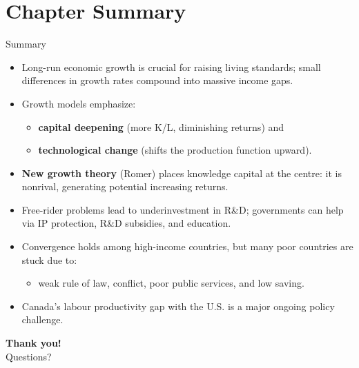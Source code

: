 \documentclass[aspectratio=169]{beamer}
\begin{document}
\section*{Chapter Summary}

\begin{frame}{Summary}
\transfade
\begin{itemize}[<+->]
  \item Long-run economic growth is crucial for raising living standards; small differences in growth rates compound into massive income gaps.
  \item Growth models emphasize:
  \begin{itemize}[<+->]
    \item \textbf{capital deepening} (more K/L, diminishing returns) and
    \item \textbf{technological change} (shifts the production function upward).
  \end{itemize}
  \item \textbf{New growth theory} (Romer) places knowledge capital at the centre: it is nonrival, generating potential increasing returns.
  \item Free-rider problems lead to \alert{underinvestment} in R\&D; governments can help via IP protection, R\&D subsidies, and education.
  \item Convergence holds among high-income countries, but many poor countries are stuck due to:
  \begin{itemize}[<+->]
    \item weak rule of law, conflict, poor public services, and low saving.
  \end{itemize}
  \item Canada's \alert{labour productivity gap} with the U.S. is a major ongoing policy challenge.
\end{itemize}
\end{frame}

\begin{frame}
\centering
\Huge \textbf{Thank you!}\\[1em]
\large Questions?
\end{frame}
\end{document}
